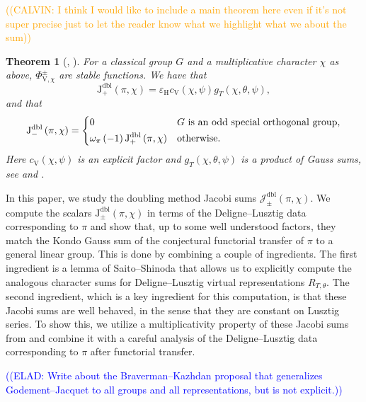 \documentclass[12pt, reqno]{amsart}
\newtheorem{theorem}{Theorem}[section]
\theoremstyle{definition}
\theoremstyle{definition}
\theoremstyle{definition}
\newcommand{\hermitianSpace}{\mathrm{V}}
\newcommand{\fieldCharacter}{\psi}
\newcommand{\centralCharacter}[1]{\omega_{#1}}
\newcommand{\dblJacobiSum}[2]{\mathcal{J}_{\pm}^{\mathrm{dbl}}\left(#1, #2\right)}
\newcommand{\genHermitianJacobiKernel}[2]{\Phi^{\pm}_{#1,#2}}
\newcommand{\dblJacobiSumScalar}[2]{\mathrm{J}_{\pm}^{\mathrm{dbl}}\left(#1, #2\right)}
\newcommand{\posDblJacobiSumScalar}[2]{\mathrm{J}_{+}^{\mathrm{dbl}}\left(#1, #2\right)}
\newcommand{\negDblJacobiSumScalar}[2]{\mathrm{J}_{-}^{\mathrm{dbl}}\left(#1, #2\right)}
\newcommand{\algebraicGroup}[1]{\boldsymbol{\mathrm{#1}}}
\newcommand{\calvin}[1]{\textcolor{orange}{\sffamily ((CALVIN: #1))}}
\newcommand{\elad}[1]{\textcolor{blue}{\sffamily ((ELAD: #1))}}
\begin{document}
\calvin{I think I would like to include a main theorem here even if it's not super precise just to let the reader know what we highlight what we about the sum}
\begin{theorem}[, ]
	For a classical group $G$ and a multiplicative character $\chi$ as above, $\genHermitianJacobiKernel{\hermitianSpace}{\chi}$ are stable functions. We have that
	$$\posDblJacobiSumScalar{\pi}{\chi} =
		\varepsilon_{\algebraicGroup{H}} c_{\hermitianSpace}\left(\chi, \fieldCharacter\right) g_T\left(\chi, \theta, \fieldCharacter\right),$$
		and that
	$$\negDblJacobiSumScalar{\pi}{\chi} = \begin{dcases} 0 & G \text{ is an odd special orthogonal group},\\
		\centralCharacter{\pi}\left(-1\right) \posDblJacobiSumScalar{\pi}{\chi} &  \text{otherwise.}
	\end{dcases}$$
Here $c_{\hermitianSpace}\left(\chi, \fieldCharacter\right)$ is an explicit factor and
$g_T\left(\chi, \theta, \fieldCharacter\right)$ is a product of Gauss sums, see  and .
\end{theorem}
In this paper, we study the doubling method Jacobi sums $\dblJacobiSum{\pi}{\chi}$. We compute the scalars $\dblJacobiSumScalar{\pi}{\chi}$ in terms of the Deligne--Lusztig data corresponding to $\pi$ and show that, up to some well understood factors, they match the Kondo Gauss sum of the conjectural functorial transfer of $\pi$ to a general linear group. This is done by combining a couple of ingredients. The first ingredient is a lemma of Saito--Shinoda \cite{SaitoShinoda2000} that allows us to explicitly compute the analogous character sums for Deligne--Lusztig virtual representations $R_{T, \theta}$.  The second ingredient, which is a key ingredient for this computation, is that these Jacobi sums are well behaved, in the sense that they are constant on Lusztig series. To show this, we utilize a multiplicativity property of these Jacobi sums from \cite{GirschZelingher2025} and combine it with a careful analysis of the Deligne--Lusztig data corresponding to $\pi$ after functorial transfer. 


\elad{Write about the Braverman--Kazhdan proposal that generalizes Godement--Jacquet to all groups and all representations, but is not explicit.}
\end{document}
